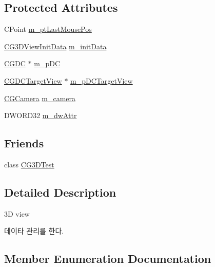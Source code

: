 \subsection*{Protected Attributes}
\begin{DoxyCompactItemize}
\item 
C\+Point \hyperlink{class_c_g3_d_view_aeac573889f9cd92ce742290fbd3aa810}{m\+\_\+pt\+Last\+Mouse\+Pos}
\item 
\hyperlink{class_c_g3_d_view_init_data}{C\+G3\+D\+View\+Init\+Data} \hyperlink{class_c_g3_d_view_adeaabb1134dc71be0edc6cafcfdceae5}{m\+\_\+init\+Data}
\item 
\hyperlink{class_c_g_d_c}{C\+G\+D\+C} $\ast$ \hyperlink{class_c_g3_d_view_a3192069b4c6def0c1ab9df02efe36d37}{m\+\_\+p\+D\+C}
\item 
\hyperlink{class_c_g_d_c_target_view}{C\+G\+D\+C\+Target\+View} $\ast$ \hyperlink{class_c_g3_d_view_a4e9001b00d6f9318c41cfc4536a7c34c}{m\+\_\+p\+D\+C\+Target\+View}
\item 
\hyperlink{class_c_g_camera}{C\+G\+Camera} \hyperlink{class_c_g3_d_view_a3a518f80ba92ae8dfe33eb34a89da6e2}{m\+\_\+camera}
\item 
D\+W\+O\+R\+D32 \hyperlink{class_c_g3_d_view_a1c7992e14ec03d22468246c8d496d136}{m\+\_\+dw\+Attr}
\end{DoxyCompactItemize}
\subsection*{Friends}
\begin{DoxyCompactItemize}
\item 
class \hyperlink{class_c_g3_d_view_a0066bb24d9976fa6f552be214b59e211}{C\+G3\+D\+Test}
\end{DoxyCompactItemize}


\subsection{Detailed Description}

\begin{DoxyItemize}
\item 3\+D view
\item 데이타 관리를 한다. 
\end{DoxyItemize}

\subsection{Member Enumeration Documentation}
\hypertarget{class_c_g3_d_view_ae3a6556009bb00e43baf4d7087921475}{}
